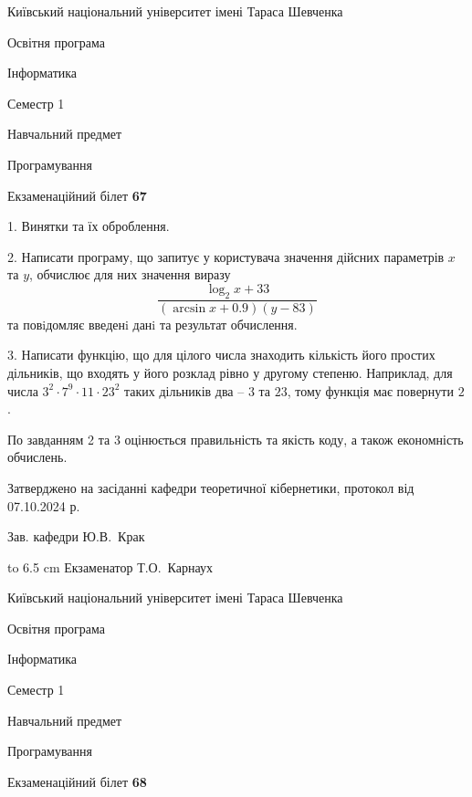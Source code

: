 \documentclass[12pt, ukrainian]{article}
\begin{document}
\newpage
{{\begin {scriptsize}\par
{ \center  Київський національний університет імені Тараса Шевченка \par}
{\parbox {5 cm}{Освітня програма \hfill}{\parbox {7 cm}{Інформатика\hfill}}\parbox {6 cm}{\hfill Семестр 1}}\par
{\parbox {5 cm} {Навчальний предмет \hfill}\parbox {7 cm}{Програмування \hfill}\parbox {6cm}{\hfill}\par}\vspace{-15pt} \end{scriptsize}}{\center Екзаменаційний білет \No \textbf { 67 }\par}}
{%
1. Винятки та їх оброблення.%
\par
2. Написати програму, що запитує у користувача значення дійсних параметрів $x$ та $y$, обчислює для них значення виразу 
$$\frac{\log_{2} x + 33}{(\arcsin x + 0.9) (y - 83)}$$ 
та повiдомляє введенi данi та результат обчислення.

\par
3. Написати функцію, що для цілого числа знаходить кількість його простих дільників, що входять у його розклад рівно у другому степеню. Наприклад, для числа $3^2{\cdot}7^9{\cdot}11{\cdot}23^{2}$ таких дільників два – $3$ та $23$, тому функція має повернути $2$.

По завданням 2 та 3 оцінюється правильність та якість коду, а також економність обчислень.

}
{\smallskip\smallskip \begin {scriptsize} Затверджено на засіданні кафедри теоретичної кібернетики, протокол   від   07.10.2024 р.\par\smallskip\smallskip\smallskip\smallskip
{\parbox {6.5 cm} {Зав. кафедри \dotfill Ю.В.~Крак}}\hspace {0.7cm} {\hbox to 6.5 cm { Екзаменатор \dotfill Т.О.~Карнаух}} \end{scriptsize}}
\vspace{0.9cm}
{{\begin {scriptsize}\par
{ \center  Київський національний університет імені Тараса Шевченка \par}
{\parbox {5 cm}{Освітня програма \hfill}{\parbox {7 cm}{Інформатика\hfill}}\parbox {6 cm}{\hfill Семестр 1}}\par
{\parbox {5 cm} {Навчальний предмет \hfill}\parbox {7 cm}{Програмування \hfill}\parbox {6cm}{\hfill}\par}\vspace{-15pt} \end{scriptsize}}{\center Екзаменаційний білет \No \textbf { 68 }\par}}
\end{document}
